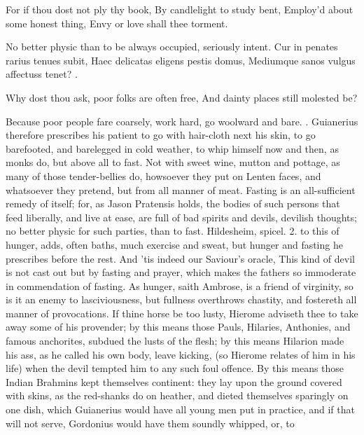 {For if thou dost not ply thy book,
By candlelight to study bent,
Employ'd about some honest thing,
Envy or love shall thee torment.

No better physic than to be always occupied, seriously intent.
Cur in penates rarius tenues subit,
Haec delicatas eligens pestis domus,
Mediumque sanos vulgus affectuss tenet? \etc{}.

Why dost thou ask, poor folks are often free,
And dainty places still molested be?

Because poor people fare coarsely, work hard, go woolward and bare.
 . Guianerius
therefore prescribes his patient to go with hair-cloth next his skin,
to go barefooted, and barelegged in cold weather, to whip himself now
and then, as monks do, but above all to fast. Not with sweet wine,
mutton and pottage, as many of those tender-bellies do, howsoever they
put on Lenten faces, and whatsoever they pretend, but from all manner
of meat. Fasting is an all-sufficient remedy of itself; for, as Jason
Pratensis holds, the bodies of such persons that feed liberally, and
live at ease, are full of bad spirits and devils, devilish
thoughts; no better physic for such parties, than to fast. Hildesheim,
spicel. 2. to this of hunger, adds, often baths, much exercise
and sweat, but hunger and fasting he prescribes before the rest. And
'tis indeed our Saviour's oracle, This kind of devil is not cast out
but by fasting and prayer, which makes the fathers so immoderate in
commendation of fasting. As hunger, saith  Ambrose, is a friend
of virginity, so is it an enemy to lasciviousness, but fullness
overthrows chastity, and fostereth all manner of provocations. If thine
horse be too lusty, Hierome adviseth thee to take away some of his
provender; by this means those Pauls, Hilaries, Anthonies, and famous
anchorites, subdued the lusts of the flesh; by this means Hilarion made
his ass, as he called his own body, leave kicking, (so Hierome
relates of him in his life) when the devil tempted him to any such foul
offence. By this means those Indian Brahmins kept themselves
continent: they lay upon the ground covered with skins, as the
red-shanks do on heather, and dieted themselves sparingly on one dish,
which Guianerius would have all young men put in practice, and if that
will not serve, Gordonius would have them soundly whipped, or, to
}
